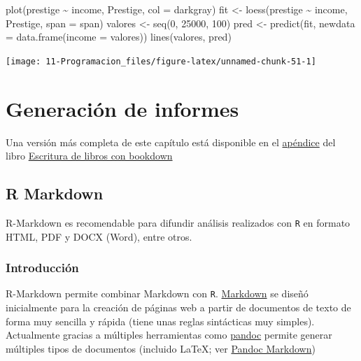 \documentclass[
]{book}
\newenvironment{Shaded}{\begin{snugshade}}{\end{snugshade}}
\newcommand{\AttributeTok}[1]{\textcolor[rgb]{0.77,0.63,0.00}{#1}}
\newcommand{\DecValTok}[1]{\textcolor[rgb]{0.00,0.00,0.81}{#1}}
\newcommand{\FunctionTok}[1]{\textcolor[rgb]{0.00,0.00,0.00}{#1}}
\newcommand{\NormalTok}[1]{#1}
\newcommand{\OtherTok}[1]{\textcolor[rgb]{0.56,0.35,0.01}{#1}}
\newcommand{\SpecialCharTok}[1]{\textcolor[rgb]{0.00,0.00,0.00}{#1}}
\newcommand{\StringTok}[1]{\textcolor[rgb]{0.31,0.60,0.02}{#1}}
\theoremstyle{break}
\begin{document}
\begin{Shaded}
\begin{Highlighting}[]
\FunctionTok{plot}\NormalTok{(prestige }\SpecialCharTok{\textasciitilde{}}\NormalTok{ income, Prestige, }\AttributeTok{col =} \StringTok{\textquotesingle{}darkgray\textquotesingle{}}\NormalTok{)}
\NormalTok{fit }\OtherTok{\textless{}{-}} \FunctionTok{loess}\NormalTok{(prestige }\SpecialCharTok{\textasciitilde{}}\NormalTok{ income, Prestige, }\AttributeTok{span =}\NormalTok{ span)}
\NormalTok{valores }\OtherTok{\textless{}{-}} \FunctionTok{seq}\NormalTok{(}\DecValTok{0}\NormalTok{, }\DecValTok{25000}\NormalTok{, }\DecValTok{100}\NormalTok{)}
\NormalTok{pred }\OtherTok{\textless{}{-}} \FunctionTok{predict}\NormalTok{(fit, }\AttributeTok{newdata =} \FunctionTok{data.frame}\NormalTok{(}\AttributeTok{income =}\NormalTok{ valores))}
\FunctionTok{lines}\NormalTok{(valores, pred)}
\end{Highlighting}
\end{Shaded}

\begin{center}\texttt{[image: 11-Programacion\_files/figure-latex/unnamed-chunk-51-1]} \end{center}

\hypertarget{generaciuxf3n-de-informes}{%
\chapter{Generación de informes}\label{generaciuxf3n-de-informes}}

Una versión más completa de este capítulo está disponible en el
\href{https://rubenfcasal.github.io/bookdown_intro/rmarkdown.html}{apéndice} del libro
\href{https://rubenfcasal.github.io/bookdown_intro}{Escritura de libros con bookdown}

\hypertarget{r-markdown}{%
\section{R Markdown}\label{r-markdown}}

R-Markdown es recomendable para difundir análisis realizados con \texttt{R} en formato HTML, PDF y DOCX (Word), entre otros.

\hypertarget{introducciuxf3n-1}{%
\subsection{Introducción}\label{introducciuxf3n-1}}

R-Markdown permite combinar Markdown con \texttt{R}. \href{http://daringfireball.net/projects/markdown/}{Markdown} se diseñó inicialmente para la creación de páginas web a partir de documentos de texto de forma muy sencilla y rápida (tiene unas reglas sintácticas muy simples). Actualmente gracias a múltiples herramientas como \href{http://pandoc.org/}{pandoc} permite generar múltiples tipos de documentos (incluido LaTeX; ver \href{http://rmarkdown.rstudio.com/authoring_pandoc_markdown.html}{Pandoc Markdown})
\end{document}
